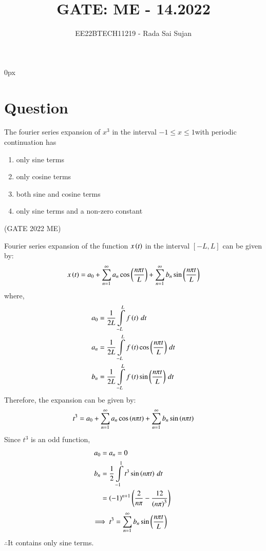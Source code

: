 \documentclass[journal,12pt,twocolumn]{IEEEtran}
\theoremstyle{remark}
\begin{document}
\parindent 0px

\title{GATE: ME - 14.2022}
\author{EE22BTECH11219 - Rada Sai Sujan$^{}$%
}
\maketitle
\newpage
\bigskip
\section*{Question}
The fourier series expansion of $x^3$ in the interval $-1\leq x\leq 1$with periodic continuation has
\begin{enumerate}[label=(\alph*)]
    \item only sine terms
    \item only cosine terms
    \item both sine and cosine terms
    \item only sine terms and a non-zero constant
\end{enumerate} \hfill(GATE 2022 ME)    \\
\solution

Fourier series expansion of the function $x\left(t\right)$ in the interval $[-L,L]$ can be given by: \\
\begin{align}
    x\left(t\right)=a_0+\sum\limits_{n=1}^{\infty}a_n\cos\left(\frac{n\pi t}{L}\right)+\sum\limits_{n=1}^{\infty}b_n\sin\left(\frac{n\pi t}{L}\right)
\end{align}
where,
\begin{align}
    a_0&=\frac{1}{2L}\int\limits_{-L}^{L}f\left(t\right)\,dt  \\
    a_n&=\frac{1}{2L}\int\limits_{-L}^{L}f\left(t\right)\cos\left(\frac{n\pi t}{L}\right)\,dt  \\
    b_n&=\frac{1}{2L}\int\limits_{-L}^{L}f\left(t\right)\sin\left(\frac{n\pi t}{L}\right)\,dt  \\
\end{align}
Therefore, the expansion can be given by:
\begin{align}
    t^3=a_0+\sum\limits_{n=1}^{\infty}a_n\cos\left(n\pi t\right)+\sum\limits_{n=1}^{\infty}b_n\sin\left(n\pi t\right)
\end{align}
Since $t^3$ is an odd function,
\begin{align}
    a_0&=a_n=0   \\
    b_n&=\frac{1}{2}\int\limits_{-1}^{1}t^3\sin\left(n\pi t\right)\,dt    \\
    &=\left(-1\right)^{n+1}\left(\frac{2}{n\pi}-\frac{12}{\left(n\pi\right)^3}\right) \
\end{align}
\begin{align}
    \implies t^3&=\sum\limits_{n=1}^{\infty}b_n\sin\left(\frac{n\pi t}{L}\right)
\end{align}
$\therefore$It contains only sine terms.
\end{document}
